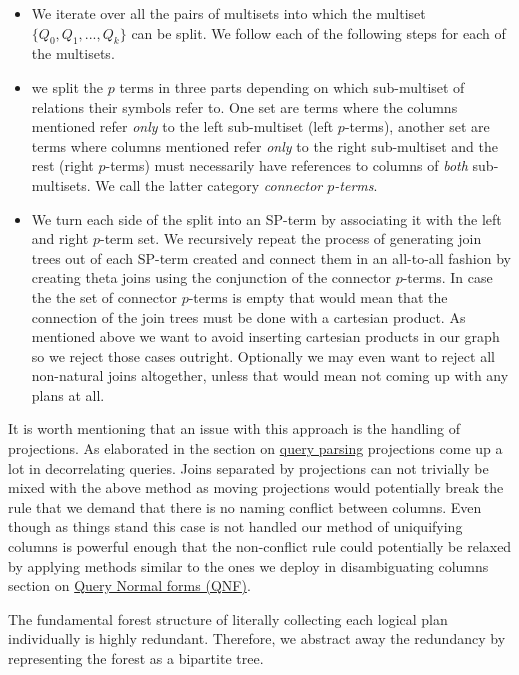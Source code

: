 \begin{itemize}
\item We iterate over all the pairs of multisets into which the multiset
  \(\{Q_0,Q_1,...,Q_k\}\) can be split. We follow each of the
  following steps for each of the multisets.
\item we split the \(p\) terms in three parts depending on which
  sub-multiset of relations their symbols refer to. One set are terms
  where the columns mentioned refer \emph{only} to the left sub-multiset
  (left \(p\)-terms), another set are terms where columns mentioned
  refer \emph{only} to the right sub-multiset and the rest (right
  \(p\)-terms) must necessarily have references to columns of \emph{both}
  sub-multisets. We call the latter category \emph{connector \(p\)-terms}.
\item We turn each side of the split into an SP-term by associating it
  with the left and right \(p\)-term set. We recursively repeat the
  process of generating join trees out of each SP-term created and
  connect them in an all-to-all fashion by creating theta joins using
  the conjunction of the connector \(p\)-terms. In case the the set of
  connector \(p\)-terms is empty that would mean that the connection
  of the join trees must be done with a cartesian product. As
  mentioned above we want to avoid inserting cartesian products in our
  graph so we reject those cases outright. Optionally we may even want
  to reject all non-natural joins altogether, unless that would mean
  not coming up with any plans at all.
\end{itemize}


It is worth mentioning that an issue with this approach is the
handling of projections. As elaborated in the section on \hyperref[sec:org860b230]{query parsing}
projections come up a lot in decorrelating queries. Joins separated by
projections can not trivially be mixed with the above method as moving
projections would potentially break the rule that we demand that there
is no naming conflict between columns. Even though as things stand
this case is not handled our method of uniquifying columns is powerful
enough that the non-conflict rule could potentially be relaxed by
applying methods similar to the ones we deploy in disambiguating
columns section on \hyperref[sec:org9e7f455]{Query Normal forms (QNF)}.

The fundamental forest structure of literally collecting each logical
plan individually is highly redundant. Therefore, we abstract away the
redundancy by representing the forest as a bipartite tree.

